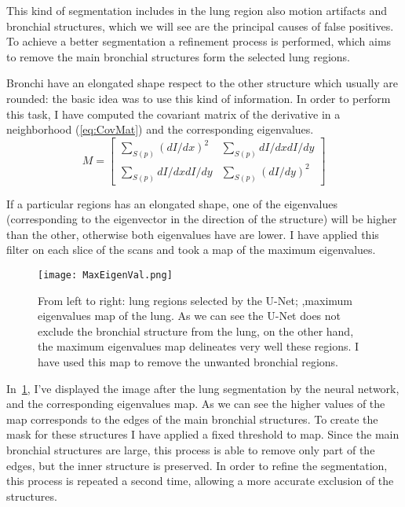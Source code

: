 \documentclass{standalone}
\begin{document}
	This kind of segmentation includes in the lung region also motion artifacts and bronchial structures, which we will see are the principal causes of false positives. To achieve a better segmentation a refinement process is performed, which aims to remove the main bronchial structures form the selected lung regions. 

	Bronchi have an elongated shape respect to the other structure which usually are rounded: the basic idea was to use this kind of information. In order to perform this task, I have  computed the covariant matrix of the derivative in a neighborhood (\ref{eq:CovMat}) and the corresponding eigenvalues. 
	\begin{equation}\label{eq:CovMat}
		M = \begin{bmatrix} \sum _{S(p)}(dI/dx)^2 & \sum _{S(p)}dI/dx dI/dy \\ \sum _{S(p)}dI/dx dI/dy & \sum _{S(p)}(dI/dy)^2 \end{bmatrix}
	\end{equation}
	
	If a particular regions has an elongated shape, one of the eigenvalues (corresponding to the eigenvector in the direction of the structure) will be higher than the other, otherwise both eigenvalues have are lower. I have applied this filter on each slice of the scans and took a map of the maximum eigenvalues. 
	\begin{figure}[h!]
		\centering
			\texttt{[image: MaxEigenVal.png]}
		\caption{From left to right: lung regions selected by the U-Net; ,maximum eigenvalues map of the lung. As we can see the U-Net does not exclude the bronchial structure from the lung, on the other hand, the maximum eigenvalues map delineates very well these regions. I have used this map to remove the unwanted bronchial regions.}\label{fig:MaxEigenval}
	\end{figure}

	In \figurename\,\ref{fig:MaxEigenval}, I've displayed the image after the lung segmentation by the neural network, and the corresponding eigenvalues map. As we can see the higher values of the map corresponds to the edges of the main bronchial structures. To create the mask for these structures I have applied a fixed threshold to map. Since the main bronchial structures are large, this process is able to remove only part of the edges, but the inner structure is preserved. In order to refine the segmentation, this process is repeated a second time, allowing a more accurate exclusion of the structures.
\end{document}
